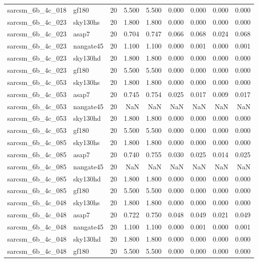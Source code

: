 \begin{tabular}{llrrrrrrr}
sarcsm\_6b\_4c\_018 & gf180 & 20 & 5.500 & 5.500 & 0.000 & 0.000 & 0.000 & 0.000 \\
sarcsm\_6b\_4c\_023 & sky130hs & 20 & 1.800 & 1.800 & 0.000 & 0.000 & 0.000 & 0.000 \\
sarcsm\_6b\_4c\_023 & asap7 & 20 & 0.704 & 0.747 & 0.066 & 0.068 & 0.024 & 0.068 \\
sarcsm\_6b\_4c\_023 & nangate45 & 20 & 1.100 & 1.100 & 0.000 & 0.001 & 0.000 & 0.001 \\
sarcsm\_6b\_4c\_023 & sky130hd & 20 & 1.800 & 1.800 & 0.000 & 0.000 & 0.000 & 0.000 \\
sarcsm\_6b\_4c\_023 & gf180 & 20 & 5.500 & 5.500 & 0.000 & 0.000 & 0.000 & 0.000 \\
sarcsm\_6b\_4c\_053 & sky130hs & 20 & 1.800 & 1.800 & 0.000 & 0.000 & 0.000 & 0.000 \\
sarcsm\_6b\_4c\_053 & asap7 & 20 & 0.745 & 0.754 & 0.025 & 0.017 & 0.009 & 0.017 \\
sarcsm\_6b\_4c\_053 & nangate45 & 20 & NaN & NaN & NaN & NaN & NaN & NaN \\
sarcsm\_6b\_4c\_053 & sky130hd & 20 & 1.800 & 1.800 & 0.000 & 0.000 & 0.000 & 0.000 \\
sarcsm\_6b\_4c\_053 & gf180 & 20 & 5.500 & 5.500 & 0.000 & 0.000 & 0.000 & 0.000 \\
sarcsm\_6b\_4c\_085 & sky130hs & 20 & 1.800 & 1.800 & 0.000 & 0.000 & 0.000 & 0.000 \\
sarcsm\_6b\_4c\_085 & asap7 & 20 & 0.740 & 0.755 & 0.030 & 0.025 & 0.014 & 0.025 \\
sarcsm\_6b\_4c\_085 & nangate45 & 20 & NaN & NaN & NaN & NaN & NaN & NaN \\
sarcsm\_6b\_4c\_085 & sky130hd & 20 & 1.800 & 1.800 & 0.000 & 0.000 & 0.000 & 0.000 \\
sarcsm\_6b\_4c\_085 & gf180 & 20 & 5.500 & 5.500 & 0.000 & 0.000 & 0.000 & 0.000 \\
sarcsm\_6b\_4c\_048 & sky130hs & 20 & 1.800 & 1.800 & 0.000 & 0.000 & 0.000 & 0.000 \\
sarcsm\_6b\_4c\_048 & asap7 & 20 & 0.722 & 0.750 & 0.048 & 0.049 & 0.021 & 0.049 \\
sarcsm\_6b\_4c\_048 & nangate45 & 20 & 1.100 & 1.100 & 0.000 & 0.001 & 0.000 & 0.001 \\
sarcsm\_6b\_4c\_048 & sky130hd & 20 & 1.800 & 1.800 & 0.000 & 0.000 & 0.000 & 0.000 \\
sarcsm\_6b\_4c\_048 & gf180 & 20 & 5.500 & 5.500 & 0.000 & 0.000 & 0.000 & 0.000 \\

\end{tabular}
